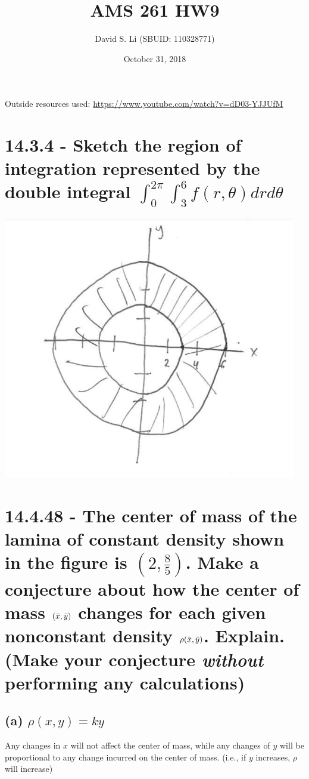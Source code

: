 \documentclass{article}
\title{AMS 261 HW9}
\author{David S. Li (SBUID: 110328771)}
\date{October 31, 2018}
\begin{document}
\maketitle

\par\noindent\large Outside resources used: \url{https://www.youtube.com/watch?v=dD03-YJJUfM}
\renewcommand{\thefootnote}{\roman{footnote}}

\section{14.3.4 - Sketch the region of integration represented by the double integral $\int_{0}^{2\pi}\int_{3}^{6}f(r, \theta)drd\theta$}

\includegraphics[]{Problem1.PNG}\centering

\raggedright

\section{14.4.48 - The center of mass of the lamina of constant density shown in the figure is $(2, \frac{8}{5})$.  Make a conjecture about how the center of mass $(\Bar{x}, \Bar{y})$ changes for each given nonconstant density $\rho(\Bar{x}, \Bar{y})$.  Explain. (Make your conjecture \textit{without} performing any calculations)}
\subsection{(a) $\rho(x, y) = ky$}
\par\noindent\large Any changes in $x$ will not affect the center of mass, while any changes of $y$ will be proportional to any change incurred on the center of mass. (i.e., if $y$ increases, $\rho$ will increase)
\end{document}
